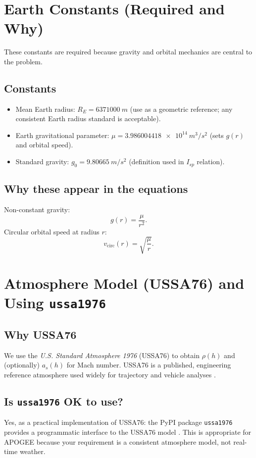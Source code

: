 \documentclass[11pt]{article}
\begin{document}
\section{Earth Constants (Required and Why)}
These constants are required because gravity and orbital mechanics are central to the problem.

\subsection{Constants}
\begin{itemize}
\item Mean Earth radius: $R_E=\SI{6371000}{m}$ (use as a geometric reference; any consistent Earth radius standard is acceptable).
\item Earth gravitational parameter: $\mu=\SI{3.986004418e14}{m^3/s^2}$ (sets $g(r)$ and orbital speed).
\item Standard gravity: $g_0=\SI{9.80665}{m/s^2}$ (definition used in $I_{sp}$ relation).
\end{itemize}

\subsection{Why these appear in the equations}
Non-constant gravity:
\begin{equation}
g(r)=\frac{\mu}{r^2}.
\end{equation}
Circular orbital speed at radius $r$:
\begin{equation}
v_{\text{circ}}(r)=\sqrt{\frac{\mu}{r}}.
\end{equation}

\section{Atmosphere Model (USSA76) and Using \texttt{ussa1976}}
\subsection{Why USSA76}
We use the \emph{U.S. Standard Atmosphere 1976} (USSA76) to obtain $\rho(h)$ and (optionally) $a_s(h)$ for Mach number. USSA76 is a published, engineering reference atmosphere used widely for trajectory and vehicle analyses \cite{NASA_USSA76}.

\subsection{Is \texttt{ussa1976} OK to use?}
Yes, as a practical implementation of USSA76: the PyPI package \texttt{ussa1976} provides a programmatic interface to the USSA76 model \cite{PyPI_USSA1976,USSA1976_Docs}. This is appropriate for APOGEE because your requirement is a consistent atmosphere model, not real-time weather.
\end{document}
